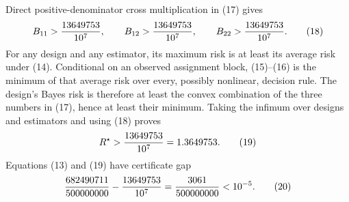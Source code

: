 Direct positive-denominator cross multiplication in (17) gives
\[
B_{11}>{13649753\over10^7},
\qquad B_{12}>{13649753\over10^7},
\qquad B_{22}>{13649753\over10^7}.                                         \tag{18}
\]
For any design and any estimator, its maximum risk is at least its average risk under (14).  Conditional on an observed assignment block, (15)--(16) is the minimum of that average risk over every, possibly nonlinear, decision rule.  The design's Bayes risk is therefore at least the convex combination of the three numbers in (17), hence at least their minimum.  Taking the infimum over designs and estimators and using (18) proves
\[
R^\star>{13649753\over10^7}=1.3649753.                                     \tag{19}
\]
Equations (13) and (19) have certificate gap
\[
{682490711\over500000000}-{13649753\over10^7}
={3061\over500000000}<10^{-5}.                                             \tag{20}
\]

